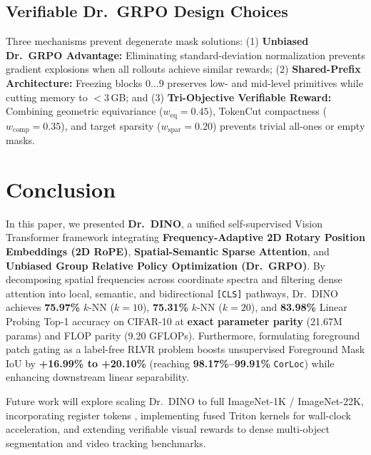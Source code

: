 \documentclass[11pt,a4paper]{article}
\begin{document}
\subsection{Verifiable Dr.\ GRPO Design Choices}
Three mechanisms prevent degenerate mask solutions: (1) \textbf{Unbiased Dr.\ GRPO Advantage:} Eliminating standard-deviation normalization prevents gradient explosions when all rollouts achieve similar rewards; (2) \textbf{Shared-Prefix Architecture:} Freezing blocks $0\dots 9$ preserves low- and mid-level primitives while cutting memory to $<3$\,GB; and (3) \textbf{Tri-Objective Verifiable Reward:} Combining geometric equivariance ($w_{\text{eq}}=0.45$), TokenCut compactness ($w_{\text{comp}}=0.35$), and target sparsity ($w_{\text{spar}}=0.20$) prevents trivial all-ones or empty masks.

\section{Conclusion}
\label{sec:conclusion}

In this paper, we presented \textbf{Dr.\ DINO}, a unified self-supervised Vision Transformer framework integrating \textbf{Frequency-Adaptive 2D Rotary Position Embeddings (2D RoPE)}, \textbf{Spatial-Semantic Sparse Attention}, and \textbf{Unbiased Group Relative Policy Optimization (Dr.\ GRPO)}. By decomposing spatial frequencies across coordinate spectra and filtering dense attention into local, semantic, and bidirectional \texttt{[CLS]} pathways, Dr.\ DINO achieves \textbf{75.97\%} $k$-NN ($k=10$), \textbf{75.31\%} $k$-NN ($k=20$), and \textbf{83.98\%} Linear Probing Top-1 accuracy on CIFAR-10 at \textbf{exact parameter parity} (21.67M params) and FLOP parity (9.20 GFLOPs). Furthermore, formulating foreground patch gating as a label-free RLVR problem boosts unsupervised Foreground Mask IoU by \textbf{+16.99\% to +20.10\%} (reaching \textbf{98.17\%--99.91\%} \texttt{CorLoc}) while enhancing downstream linear separability.

Future work will explore scaling Dr.\ DINO to full ImageNet-1K / ImageNet-22K, incorporating register tokens \cite{darcet2024vision}, implementing fused Triton kernels for wall-clock acceleration, and extending verifiable visual rewards to dense multi-object segmentation and video tracking benchmarks.
\end{document}
